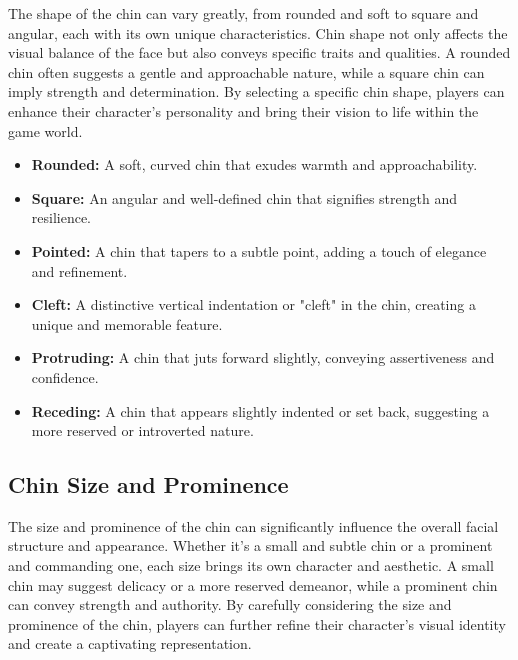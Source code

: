 \documentclass[12pt]{book}  %
\begin{document}
The shape of the chin can vary greatly, from rounded and soft to square and angular, each with its own unique characteristics. Chin shape not only affects the visual balance of the face but also conveys specific traits and qualities. A rounded chin often suggests a gentle and approachable nature, while a square chin can imply strength and determination. By selecting a specific chin shape, players can enhance their character's personality and bring their vision to life within the game world.

\begin{itemize}
    \item \textbf{Rounded:} A soft, curved chin that exudes warmth and approachability.
    \item \textbf{Square:} An angular and well-defined chin that signifies strength and resilience.
    \item \textbf{Pointed:} A chin that tapers to a subtle point, adding a touch of elegance and refinement.
    \item \textbf{Cleft:} A distinctive vertical indentation or "cleft" in the chin, creating a unique and memorable feature.
    \item \textbf{Protruding:} A chin that juts forward slightly, conveying assertiveness and confidence.
    \item \textbf{Receding:} A chin that appears slightly indented or set back, suggesting a more reserved or introverted nature.
\end{itemize}

\subsection{\textbf{Chin Size and Prominence}}

The size and prominence of the chin can significantly influence the overall facial structure and appearance. Whether it's a small and subtle chin or a prominent and commanding one, each size brings its own character and aesthetic. A small chin may suggest delicacy or a more reserved demeanor, while a prominent chin can convey strength and authority. By carefully considering the size and prominence of the chin, players can further refine their character's visual identity and create a captivating representation.
\end{document}
